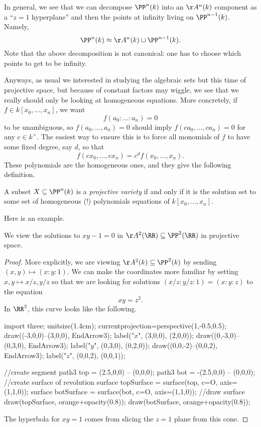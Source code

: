 In general, we see that we can decompose $\PP^n(k)$ into an $\AA^n(k)$ component as a ``$z=1$ hyperplane'' and then the points at infinity living on $\PP^{n-1}(k)$. Namely,
\[\PP^n(k)\approx\AA^n(k)\sqcup\PP^{n-1}(k).\]
Note that the above decomposition is not canonical: one has to choose which points to get to be infinity.

Anyways, as usual we interested in studying the algebraic sets but this time of projective space, but because of constant factors may wiggle, we see that we really should only be looking at homogeneous equations. More concretely, if $f\in k[x_0,\ldots,x_n]$, we want
\[f(a_0:\ldots:a_n)=0\]
to be unambiguous, so $f(a_0,\ldots,a_n)=0$ should imply $f(ca_0,\ldots,ca_n)=0$ for any $c\in k^\times$. The easiest way to ensure this is to force all monomials of $f$ to have some fixed degree, say $d$, so that
\[f(cx_0,\ldots,cx_n)=c^df(x_0,\ldots,x_n).\]
These polynomials are the homogeneous ones, and they give the following definition.
\begin{definition}
	A subset $X\subseteq\PP^n(k)$ is a \textit{projective variety} if and only if it is the solution set to some set of homogeneous (!) polynomials equations of $k[x_0,\ldots,x_n]$.
\end{definition}
Here is an example.
\begin{exe}
	We view the solutions to $xy-1=0$ in $\AA^2(\RR)\subseteq\PP^2(\RR)$ in projective space.
\end{exe}
\begin{proof}
	More explicitly, we are viewing $\AA^2(k)\subseteq\PP^2(k)$ by sending $(x,y)\mapsto(x:y:1)$. We can make the coordinates more familiar by setting $x,y\mapsto x/z,y/z$ so that we are looking for solutions $(x/z:y/z:1)=(x:y:z)$ to the equation
	\[xy=z^2.\]
	In $\RR^3$, this curve looks like the following.
	\begin{center}
		\begin{asy}
			import three;
			unitsize(1.4cm);
			currentprojection=perspective(1,-0.5,0.5);
			draw((-3,0,0)--(3,0,0), EndArrow3);
			label("$x$", (3,0,0), (2,0,0));
			draw((0,-3,0)--(0,3,0), EndArrow3);
			label("$y$", (0,3,0), (0,2,0));
			draw((0,0,-2)--(0,0,2), EndArrow3);
			label("$z$", (0,0,2), (0,0,1));
			
			//create segment
			path3 top = (2.5,0,0) -- (0,0,0);
			path3 bot = -(2.5,0,0) -- (0,0,0);
			//create surface of revolution
			surface topSurface = surface(top, c=O, axis=(1,1,0));
			surface botSurface = surface(bot, c=O, axis=(1,1,0));
			//draw surface
			draw(topSurface, orange+opacity(0.8));
			draw(botSurface, orange+opacity(0.8));
		\end{asy}
	\end{center}
	The hyperbola for $xy=1$ comes from slicing the $z=1$ plane from this cone.
\end{proof}

